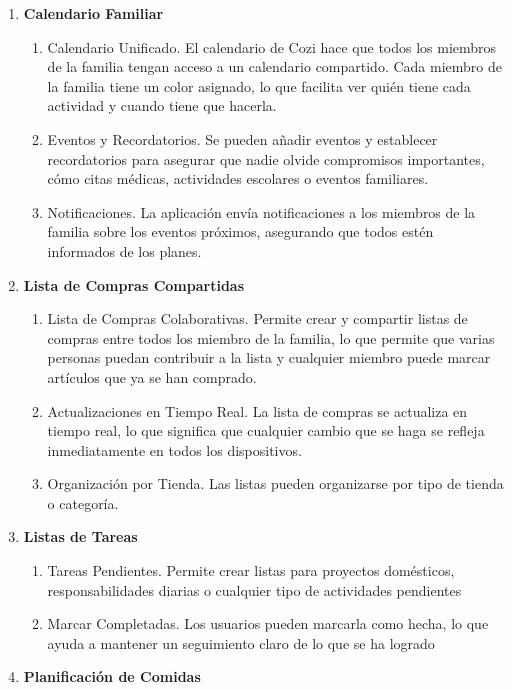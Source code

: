 \begin{enumerate}
    \item \textbf{Calendario Familiar}
    \begin{enumerate}
        \item Calendario Unificado. El calendario de Cozi hace que todos los miembros de la familia tengan acceso a un calendario compartido. 
        Cada miembro de la familia tiene un color asignado, lo que facilita ver quién tiene cada actividad y cuando tiene que hacerla.
        \item Eventos y Recordatorios. Se pueden añadir eventos y establecer recordatorios para asegurar que nadie olvide compromisos importantes, cómo
        citas médicas, actividades escolares o eventos familiares.
        \item Notificaciones. La aplicación envía notificaciones a los miembros de la familia sobre los eventos próximos, asegurando que todos estén informados de los planes.
    \end{enumerate}
    \item \textbf{Lista de Compras Compartidas}
    \begin{enumerate}
        \item Lista de Compras Colaborativas. Permite crear y compartir listas de compras entre todos los miembro de la familia, 
        lo que permite que varias personas puedan contribuir a la lista y cualquier miembro puede marcar artículos que ya se han comprado. 
        \item Actualizaciones en Tiempo Real. La lista de compras se actualiza en tiempo real, lo que significa que cualquier cambio que se haga se refleja inmediatamente en todos los dispositivos.
        \item Organización por Tienda. Las listas pueden organizarse por tipo de tienda o categoría.
    \end{enumerate}
    \item \textbf{Listas de Tareas}
    \begin{enumerate}
        \item Tareas Pendientes. Permite crear listas para proyectos domésticos, responsabilidades diarias o cualquier tipo de actividades pendientes
        \item Marcar Completadas. Los usuarios pueden marcarla como hecha, lo que ayuda a mantener un seguimiento claro de lo que se ha logrado
    \end{enumerate}
    \item \textbf{Planificación de Comidas}

\end{enumerate}
